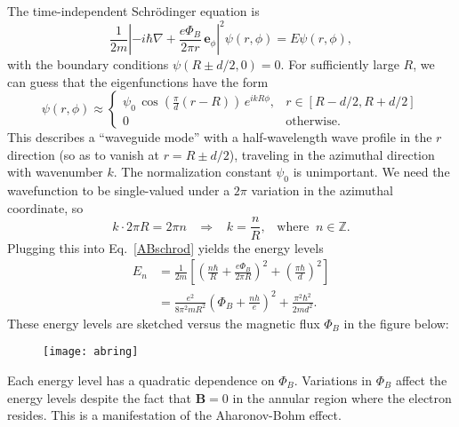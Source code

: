 \documentclass[pra,12pt]{revtex4}
\begin{document}
The time-independent Schr\"odinger equation is
\begin{equation}
  \frac{1}{2m}\left|-i\hbar\nabla+
  \frac{e\Phi_B}{2\pi r} \, \mathbf{e}_\phi\right|^2 \psi(r,\phi)
  = E\psi(r,\phi),
  \label{ABschrod}
\end{equation}
with the boundary conditions $\psi(R\pm d/2,0) = 0$.  For sufficiently
large $R$, we can guess that the eigenfunctions have the form
\begin{equation}
  \psi(r,\phi) \approx
  \begin{cases}
  \psi_0 \, \cos\left(\frac{\pi}{d}(r-R)\right)\, e^{i k R \phi},
  & r \in [R-d/2, R + d/2] \\
  0 & \textrm{otherwise}.
  \end{cases}
\end{equation}
This describes a ``waveguide mode'' with a half-wavelength wave
profile in the $r$ direction (so as to vanish at $r = R \pm d/2$),
traveling in the azimuthal direction with wavenumber $k$.  The
normalization constant $\psi_0$ is unimportant.  We need the
wavefunction to be single-valued under a $2\pi$ variation in the
azimuthal coordinate, so
\begin{equation}
  k \cdot 2\pi R = 2\pi n \;\;\;\Rightarrow \;\;\; k = \frac{n}{R},
  \;\;\;\mathrm{where}\;\; n \in \mathbb{Z}.
\end{equation}
Plugging this into Eq.~\eqref{ABschrod} yields the energy levels
\begin{align}
  E_n &= \frac{1}{2m} \left[
    \left(\frac{n\hbar}{R} + \frac{e\Phi_B}{2\pi R}\right)^2
    + \left(\frac{\pi\hbar}{d}\right)^2 \right] \\
  &= \frac{e^2}{8\pi^2mR^2} \left(\Phi_B + \frac{nh}{e} \right)^2
  + \frac{\pi^2\hbar^2}{2md^2}.
  \label{abcurves}
\end{align}
These energy levels are sketched versus the magnetic flux $\Phi_B$ in
the figure below:

\begin{figure}[h]
  \centering\texttt{[image: abring]}
\end{figure}

Each energy level has a quadratic dependence on $\Phi_B$.  Variations
in $\Phi_B$ affect the energy levels despite the fact that $\mathbf{B}
= 0$ in the annular region where the electron resides.  This is a
manifestation of the Aharonov-Bohm effect.
\end{document}
